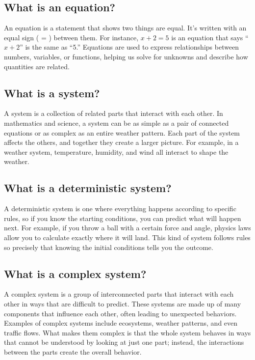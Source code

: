 \documentclass[12pt]{article}
\begin{document}
\subsection{What is an equation?}
An equation is a statement that shows two things are equal. It’s written with an equal sign ( = ) between them. For instance, \( x + 2 = 5 \) is an equation that says “\( x + 2 \)” is the same as “5.” Equations are used to express relationships between numbers, variables, or functions, helping us solve for unknowns and describe how quantities are related.

\subsection{What is a system?}
A system is a collection of related parts that interact with each other. In mathematics and science, a system can be as simple as a pair of connected equations or as complex as an entire weather pattern. Each part of the system affects the others, and together they create a larger picture. For example, in a weather system, temperature, humidity, and wind all interact to shape the weather.

\subsection{What is a deterministic system?}
A deterministic system is one where everything happens according to specific rules, so if you know the starting conditions, you can predict what will happen next. For example, if you throw a ball with a certain force and angle, physics laws allow you to calculate exactly where it will land. This kind of system follows rules so precisely that knowing the initial conditions tells you the outcome.

\subsection{What is a complex system?}
A complex system is a group of interconnected parts that interact with each other in ways that are difficult to predict. These systems are made up of many components that influence each other, often leading to unexpected behaviors. Examples of complex systems include ecosystems, weather patterns, and even traffic flows. What makes them complex is that the whole system behaves in ways that cannot be understood by looking at just one part; instead, the interactions between the parts create the overall behavior.
\end{document}
